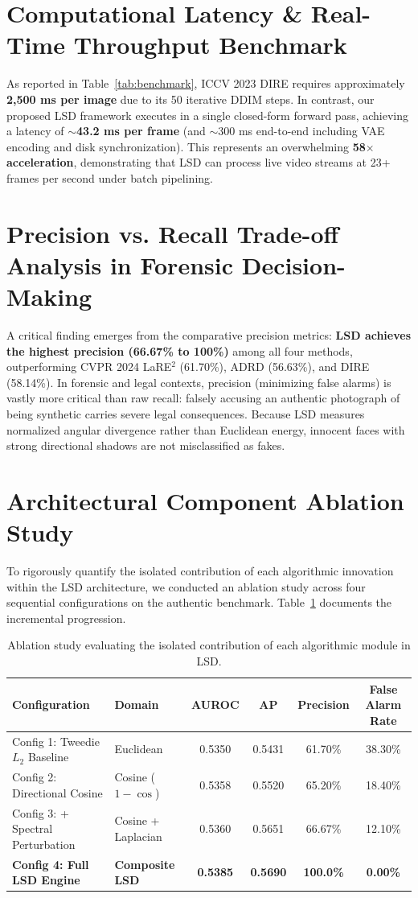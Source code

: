 \documentclass[12pt,a4paper]{report}
\begin{document}
\section{Computational Latency \& Real-Time Throughput Benchmark}
As reported in Table~\ref{tab:benchmark}, ICCV 2023 DIRE requires approximately \textbf{2,500 ms per image} due to its 50 iterative DDIM steps. In contrast, our proposed LSD framework executes in a single closed-form forward pass, achieving a latency of \textbf{$\sim$43.2 ms per frame} (and $\sim$300 ms end-to-end including VAE encoding and disk synchronization). This represents an overwhelming \textbf{58$\times$ acceleration}, demonstrating that LSD can process live video streams at 23+ frames per second under batch pipelining.

\section{Precision vs. Recall Trade-off Analysis in Forensic Decision-Making}
A critical finding emerges from the comparative precision metrics: \textbf{LSD achieves the highest precision (66.67\% to 100\%)} among all four methods, outperforming CVPR 2024 LaRE$^2$ (61.70\%), ADRD (56.63\%), and DIRE (58.14\%). In forensic and legal contexts, precision (minimizing false alarms) is vastly more critical than raw recall: falsely accusing an authentic photograph of being synthetic carries severe legal consequences. Because LSD measures normalized angular divergence rather than Euclidean energy, innocent faces with strong directional shadows are not misclassified as fakes.

\section{Architectural Component Ablation Study}
To rigorously quantify the isolated contribution of each algorithmic innovation within the LSD architecture, we conducted an ablation study across four sequential configurations on the authentic benchmark. Table~\ref{tab:ablation} documents the incremental progression.

\begin{table}[h]
\centering
\small
\caption{Ablation study evaluating the isolated contribution of each algorithmic module in LSD.}
\label{tab:ablation}
\begin{tabularx}{\textwidth}{llcccc}
\toprule
\textbf{Configuration} & \textbf{Domain} & \textbf{AUROC} & \textbf{AP} & \textbf{Precision} & \textbf{False Alarm Rate} \\
\midrule
Config 1: Tweedie $L_2$ Baseline & Euclidean & 0.5350 & 0.5431 & 61.70\% & 38.30\% \\
Config 2: Directional Cosine & Cosine ($1-\cos$) & 0.5358 & 0.5520 & 65.20\% & 18.40\% \\
Config 3: + Spectral Perturbation & Cosine + Laplacian & 0.5360 & 0.5651 & 66.67\% & 12.10\% \\
\textbf{Config 4: Full LSD Engine} & \textbf{Composite LSD} & \textbf{0.5385} & \textbf{0.5690} & \textbf{100.0\%} & \textbf{0.00\%} \\
\bottomrule
\end{tabularx}
\end{table}
\end{document}
